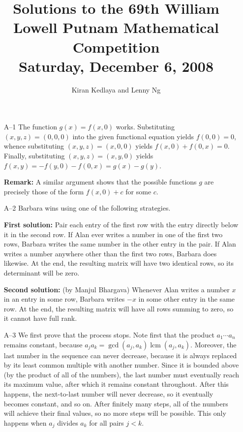 \documentclass[amssymb,twocolumn,pra,10pt,aps]{revtex4-1}
\DeclareMathOperator{\lcm}{lcm}
\begin{document}
\title{Solutions to the 69th William Lowell Putnam Mathematical Competition \\
    Saturday, December 6, 2008}
\author{Kiran Kedlaya and Lenny Ng}
\noaffiliation
\maketitle

\begin{itemize}

\item[A--1]
The function $g(x) = f(x,0)$ works. Substituting $(x,y,z) = (0,0,0)$ into the given functional equation yields $f(0,0) = 0$, whence substituting $(x,y,z) = (x,0,0)$ yields $f(x,0)+f(0,x)=0$. Finally, substituting $(x,y,z) = (x,y,0)$ yields $f(x,y) = -f(y,0)-f(0,x) = g(x)-g(y)$.

\textbf{Remark:} A similar argument shows that the possible functions $g$
are precisely those of the form  $f(x,0) + c$ for some $c$.

\item[A--2]
Barbara wins using one of the following strategies.

\textbf{First solution:}
Pair each entry of the first row with the entry directly below it in
the second row. If Alan ever writes a number in one of the first two
rows, Barbara writes the same number in the other entry in the pair.
If Alan writes a number anywhere other than the first two rows, Barbara
does likewise.
At the end, the resulting matrix will have two identical rows, so its
determinant will be zero.

\textbf{Second solution:} (by Manjul Bhargava)
Whenever Alan writes a number $x$ in an entry in some row, Barbara writes
$-x$ in some other entry in the same row.
At the end, the resulting matrix will have all rows summing to zero,
so it cannot have full rank.

\item[A--3]
We first prove that the process stops. Note first that the product
$a_1 \cdots a_n$ remains constant, because
$a_j a_k = \gcd(a_j, a_k) \lcm(a_j, a_k)$. Moreover,
the last number in the sequence can never decrease, because it is always
replaced by its least common multiple with another number.
Since it is bounded above (by the product
of all of the numbers), the last number must eventually reach its
maximum value, after which it remains constant throughout. After this
happens, the next-to-last number will never decrease, so it eventually
becomes constant, and so on. After finitely many steps, all of the numbers
will achieve their final values, so
no more steps will be possible. This only happens when
$a_j$ divides $a_k$ for all pairs $j < k$.


\end{itemize}
\end{document}
